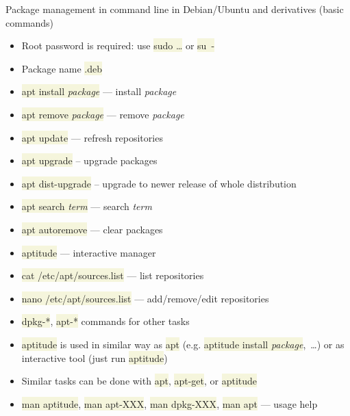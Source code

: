\documentclass[compress, xelatex, 11pt, xcolor=svgnames, aspectratio=169,
	hyperref={
		bookmarks=true,
		unicode=true,
		colorlinks=true,
		pdftitle={Linux, command line and MetaCentrum},
		plainpages=false,
		pdfauthor={Vojtech Zeisek},
		pdfsubject={Course about use of Linux command line, writing shell scripts and using MetaCentrum of CESNET},
		pdfcreator={XeLaTeX},
		pdfkeywords={Linux, GNU, BASH, shell, command line, MetaCentrum},
		linkcolor=DarkRed, %
		anchorcolor=DarkBlue, %
		citecolor=Indigo, %
		filecolor=NavyBlue, %
		menucolor=DarkMagenta, %
		urlcolor=DarkBlue, %
		},
	url={hyphens, lowtilde} %
	]{beamer}
\renewcommand{\texttt}[1]{\colorbox{Beige}{{\ttfamily #1}}}
\begin{document}
\begin{frame}[allowframebreaks]{Package management in command line in Debian/Ubuntu and derivatives (basic commands)}
	\begin{itemize}
		\item Root password is required: use \texttt{sudo \ldots} or \texttt{su~-}
		\item Package name \texttt{*.deb}
		\item \texttt{apt install \textit{package}} --- install \textit{package}
		\item \texttt{apt remove \textit{package}} --- remove \textit{package}
		\item \texttt{apt update} --- refresh repositories
		\item \texttt{apt upgrade} -- upgrade packages
		\item \texttt{apt dist-upgrade} -- upgrade to newer release of whole distribution
		\item \texttt{apt search \textit{term}} --- search \textit{term}
		\item \texttt{apt autoremove} --- clear packages
		\item \texttt{aptitude} --- interactive manager
		\item \texttt{cat /etc/apt/sources.list} --- list repositories
		\item \texttt{nano /etc/apt/sources.list} --- add/remove/edit repositories
		\item \texttt{dpkg-*}, \texttt{apt-*} commands for other tasks
		\item \texttt{aptitude} is used in similar way as \texttt{apt} (e.g. \texttt{aptitude install \textit{package}},~\ldots) or as interactive tool (just run \texttt{aptitude})
		\item Similar tasks can be done with \texttt{apt}, \texttt{apt-get}, or \texttt{aptitude}
		\item \texttt{man aptitude}, \texttt{man apt-XXX}, \texttt{man dpkg-XXX}, \texttt{man apt} --- usage help
	\end{itemize}
\end{frame}
\end{document}
